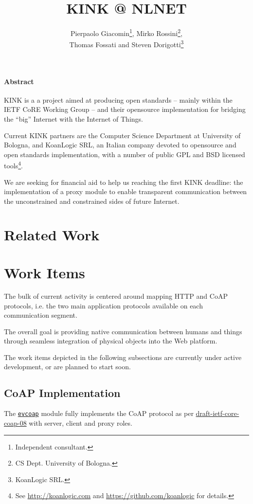 \documentclass[12pt]{article}
\title{KINK @ NLNET}
\author{Pierpaolo Giacomin\footnote{Independent consultant.}, Mirko Rossini\footnote{CS Dept. University of Bologna.},\\Thomas Fossati and Steven Dorigotti\footnote{KoanLogic SRL.}}
\newcommand{\swmod}[1]{\mbox{\texttt{#1}}}
\begin{document}
\maketitle
\tableofcontents

\paragraph{Abstract}
KINK is a a project aimed at producing open standards -- mainly within the IETF CoRE Working Group -- and their \mbox{opensource} implementation for bridging the ``big'' Internet with the Internet of Things.

Current KINK partners are the Computer Science Department at University of Bologna, and KoanLogic SRL, an Italian company devoted to \mbox{opensource} and open standards implementation, with a number of public GPL and BSD licensed tools\footnote{See \href{http://koanlogic.com}{http://koanlogic.com} and \href{https://github.com/koanlogic}{https://github.com/koanlogic} for details.}.

We are seeking for financial aid to help us reaching the first KINK deadline: the implementation of a proxy module to enable transparent communication between the unconstrained and constrained sides of future Internet.

\section{Related Work}


\section{Work Items}
The bulk of current activity is centered around mapping HTTP and CoAP protocols, i.e. the two main application protocols available on each communication segment.

The overall goal is providing native communication between humans and things through seamless integration of physical objects into the Web platform.

The work items depicted in the following subsections are currently under active development, or are planned to start soon.

\subsection{CoAP Implementation}
The \href{https://github.com/koanlogic/webthings/tree/master/bits/evcoap}{\swmod{evcoap}} module fully implements the CoAP protocol as per \href{http://tools.ietf.org/html/draft-ietf-core-coap}{draft-ietf-core-coap-08} with server, client and proxy roles.
\end{document}
